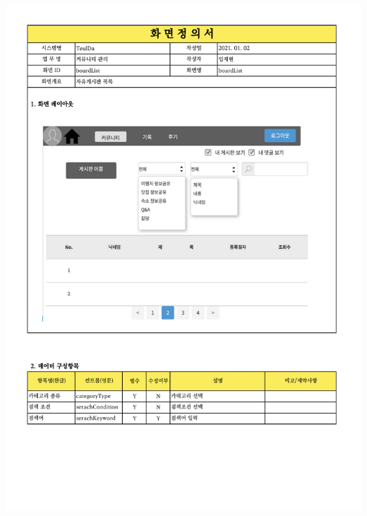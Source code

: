{{{{{{{{{{{{{{{{{{{{{{{{{{{{{{{{{{{{{{{{{{{{\includegraphics[width=20cm]{./Figure/Analysis/Display/community/community_03.pdf} \\
}}}}}}}}}}}}}}}}}}}}}}}}}}}}}}}}}}}}}}}}}}}}
